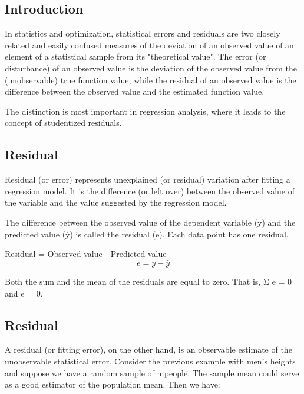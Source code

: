 \documentclass[Main.tex]{subfiles}
\begin{document}
	

\subsection{Introduction}
In statistics and optimization, statistical errors and residuals are two closely related and easily confused measures of the deviation of an observed value of an element of a statistical sample from its "theoretical value". The error (or disturbance) of an observed value is the deviation of the observed value from the (unobservable) true function value, while the residual of an observed value is the difference between the observed value and the estimated function value.

The distinction is most important in regression analysis, where it leads to the concept of studentized residuals.


\subsection{Residual}
Residual (or error) represents unexplained (or residual) variation after fitting a regression model. It is the difference (or left over) between the observed value of the variable and the value suggested by the regression model.



The difference between the observed value of the dependent variable (y) and the predicted value (ŷ) is called the residual (e). Each data point has one residual.

Residual = Observed value - Predicted value 
\[e = y - \hat{y} \]

Both the sum and the mean of the residuals are equal to zero. That is, Σ e = 0 and e = 0.





\subsection{Residual}
A residual (or fitting error), on the other hand, is an observable estimate of the unobservable statistical error. Consider the previous example with men's heights and suppose we have a random sample of n people. The sample mean could serve as a good estimator of the population mean. Then we have:
\end{document}
